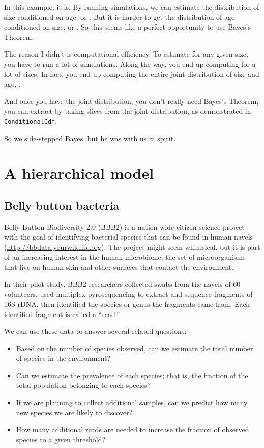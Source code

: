 \documentclass[12pt]{book}
\begin{document}
In this example, it is.  By running simulations, we can estimate the
distribution of size conditioned on age, or .  But it is
harder to get the distribution of age conditioned on size, or
.  So this seems like a perfect opportunity to use Bayes's
Theorem.

The reason I didn't is computational efficiency.  To estimate
 for any given size, you have to run a lot of simulations.
Along the way, you end up computing  for a lot of sizes.
In fact, you end up computing the entire joint distribution of size
and age, .

And once you have the joint distribution, you don't really need
Bayes's Theorem, you can extract  by taking slices from
the joint distribution, as demonstrated in {\tt ConditionalCdf}.

So we side-stepped Bayes, but he was with us in spirit.


\chapter{A hierarchical model}

\section{Belly button bacteria}

Belly Button Biodiversity 2.0 (BBB2) is a nation-wide citizen
science project with the goal of identifying bacterial species that
can be found in human navels (\url{http://bbdata.yourwildlife.org}).
The project might seem whimsical, but it is part of an increasing
interest in the human microbiome, the set of microorganisms that live
on human skin and other surfaces that contact the environment.

In their pilot study, BBB2 researchers collected swabs from the navels
of 60 volunteers, used multiplex pyrosequencing to extract and sequence
fragments of 16S rDNA, then identified the species or genus the
fragments came from.  Each identified fragment is called a ``read.''

We can use these data to answer several related questions:

\begin{itemize}

\item Based on the number of species observed, can we estimate
  the total number of species in the environment?

\item Can we estimate the prevalence of each species; that is, the
  fraction of the total population belonging to each species?

\item If we are planning to collect additional samples, can we predict
  how many new species we are likely to discover?

\item How many additional reads are needed to increase the
  fraction of observed species to a given threshold?

\end{itemize}
\end{document}

